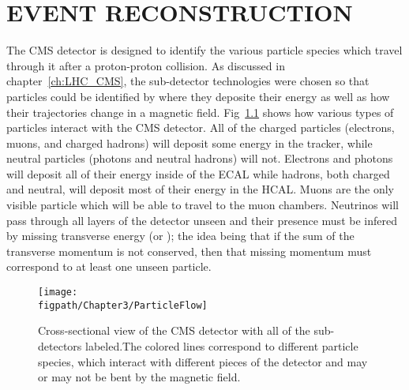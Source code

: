 %
%
%



\chapter{\uppercase {Event Reconstruction}}
\label{ch:event_reconstruction}

The CMS detector is designed to identify the various particle species which travel through it after a proton-proton collision.
As discussed in chapter~\ref{ch:LHC_CMS}, the sub-detector technologies were chosen so that particles could be identified by where they deposite their energy as well as how their trajectories change in a magnetic field.
Fig~\ref{fig:particle_flow} shows how various types of particles interact with the CMS detector.
All of the charged particles (\ie electrons, muons, and charged hadrons) will deposit some energy in the tracker, while neutral particles (\ie photons and neutral hadrons) will not.
Electrons and photons will deposit all of their energy inside of the ECAL while hadrons, both charged and neutral, will deposit most of their energy in the HCAL.
Muons are the only visible particle which will be able to travel to the muon chambers.
Neutrinos will pass through all layers of the detector unseen and their presence must be infered by missing transverse energy (\MET or \ETslash); the idea being that if the sum of the transverse momentum is not conserved, then that missing momentum must correspond to at least one unseen particle.

\begin{figure}[!hbt]
	\centering
	\texttt{[image: \\figpath/Chapter3/ParticleFlow]}
	\caption{Cross-sectional view of the CMS detector with all of the sub-detectors labeled.The colored lines correspond to different particle species, which interact with different pieces of the detector and may or may not be bent by the magnetic field.}
	\label{fig:particle_flow}
\end{figure}


